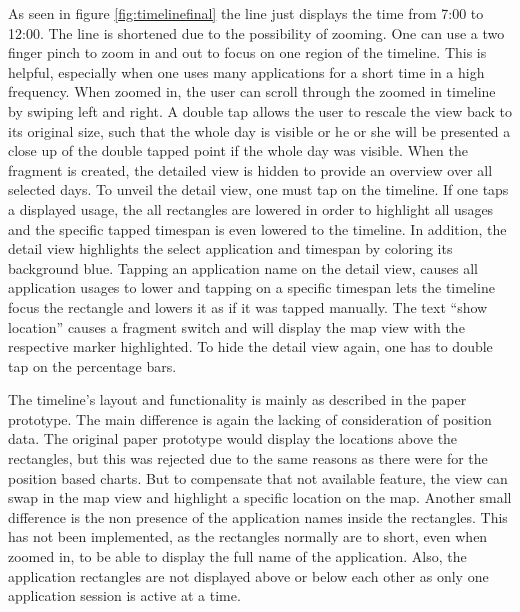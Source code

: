 As  seen in figure \ref{fig:timelinefinal} the line just displays the time from 7:00 to 12:00. The line is shortened due to the possibility of zooming. One can use a two finger pinch to zoom in and out to focus on one region of the timeline. This is helpful, especially when one uses many applications for a short time in a high frequency. When zoomed in, the user can scroll through the zoomed in timeline by swiping left and right. A double tap allows the user to rescale the view back to its original size, such that the whole day is visible or he or she will be presented a close up of the double tapped point if the whole day was visible. When the fragment is created, the detailed view is hidden to provide an overview over all  selected days. To unveil the detail view, one must tap on the timeline. If one taps a displayed usage, the all rectangles are lowered in order to highlight all usages and the specific tapped timespan is even lowered to the timeline. In addition, the detail view highlights the select application and timespan by coloring its background blue. Tapping an application name on the detail view, causes all application usages to lower and tapping on a specific timespan lets the timeline focus the rectangle and lowers it as if it was tapped manually. The text ``show location'' causes a fragment switch and will display the map view with the respective marker highlighted. To hide the detail view again, one has to double tap on the percentage bars.

The  timeline's layout and functionality is mainly as described in the paper prototype. The main difference is again the lacking of consideration of position data. The original paper prototype would display the locations above the rectangles, but this was rejected due to the same reasons as there were for the position based charts. But to compensate that not available feature, the view can swap in the map view and highlight a specific location on the map. Another small difference is the non presence of the application names inside the rectangles. This has not been implemented, as the rectangles normally are to short, even when zoomed in, to be able to display the full name of the application. Also, the application rectangles are not displayed above or below each other as only one application session is active at a time.

